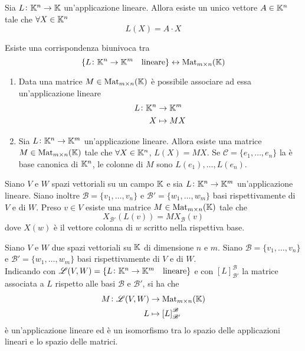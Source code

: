 
\begin{thm}
	Sia $ L \colon \mathbb{K}^n \to \mathbb{K} $ un'applicazione lineare. Allora esiste un unico vettore $ A \in \mathbb{K}^n $ tale che $ \forall X \in \mathbb{K}^n $ \[L(X) = A \cdot X\]
\end{thm}

\begin{thm}
	Esiste una corrispondenza biunivoca tra \[\{L \colon \mathbb{K}^n \to \mathbb{K}^m \quad \mathrm{lineare}\} \leftrightarrow \mathrm{Mat}_{m \times n}(\mathbb{K})\]
	\begin{enumerate}
		\item Data una matrice $ M \in \mathrm{Mat}_{m \times n}(\mathbb{K}) $ è possibile associare ad essa un'applicazione lineare
		\begin{align*}
		L \colon \mathbb{K}^n & \to \mathbb{K}^m \\
		X & \mapsto MX
		\end{align*}
		\item Sia $ L \colon \mathbb{K}^n \to \mathbb{K}^m $ un'applicazione lineare. Allora esiste una matrice $ M \in \mathrm{Mat}_{m \times n}(\mathbb{K}) $ tale che $ \forall X \in \mathbb{K}^n $, $ L(X) = MX $. Se $ \mathscr{C} = \{e_1, \ldots , e_n\} $ la è base canonica di $ \mathbb{K}^n $, le colonne di $ M $ sono $ L(e_1), \ldots, L(e_n) $.
	\end{enumerate}
\end{thm}

\begin{thm}
	Siano $ V $ e $ W $ spazi vettoriali su un campo $ \mathbb{K} $ e sia $ L \colon \mathbb{K}^n \to \mathbb{K}^m $ un'applicazione lineare. Siano inoltre $ \mathscr{B} = \{v_1, \ldots, v_n\} $ e $ \mathscr{B}' = \{w_1, \ldots, w_m\} $ basi rispettivamente di $ V $ e di $ W $. Preso $ v \in V $ esiste una matrice $ M \in \mathrm{Mat}_{m \times n}(\mathbb{K}) $ tale che \[X_{\mathscr{B} '} (L(v)) = M X_{\mathscr{B}} (v) \] dove $ X(w) $ è il vettore colonna di $ w $ scritto nella rispettiva base. 
\end{thm}

\begin{thm}
	Siano $ V $ e $ W $ due spazi vettoriali su $ \mathbb{K} $ di dimensione $ n $ e $ m $. Siano $ \mathscr{B} = \{v_1, \ldots, v_n\} $ e $ \mathscr{B}' = \{w_1, \ldots, w_m\} $ basi rispettivamente di $ V $ e di $ W $. \\ Indicando con $ \mathscr{L}(V, W) = \{L \colon \mathbb{K}^n \to \mathbb{K}^m \quad \mathrm{lineare}\} $ e con $ \left [L \right ]_{\mathscr{B}'} ^{\mathscr{B}} $ la matrice associata a $ L $ rispetto alle basi $ \mathscr{B} $ e $ \mathscr{B}' $, si ha che 
	\begin{align*}
	M \colon \mathscr{L}(V, W) & \to \mathrm{Mat}_{m \times n}(\mathbb{K})\\
	L & \mapsto \left [L \right ]_{\mathscr{B}'} ^{\mathscr{B}}
	\end{align*}
	è un'applicazione lineare ed è un isomorfismo tra lo spazio delle applicazioni lineari e lo spazio delle matrici. 
\end{thm}

